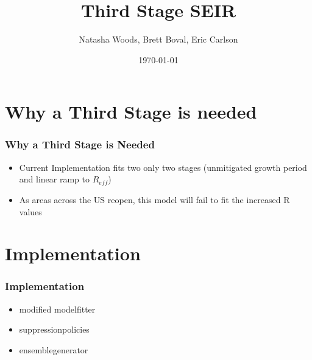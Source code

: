 \documentclass{beamer}
\title[Third Stage SEIR]{Third Stage SEIR} %
\author[Natasha Woods, Brett Boval, Eric Carlson]{Natasha Woods, Brett Boval, Eric Carlson} %
\date{\today} %
\begin{document}
\begin{frame}
\titlepage %
\end{frame}

\begin{frame}
\tableofcontents
\end{frame}



\section{Why a Third Stage is needed} %
\begin{frame}
\frametitle{Why a Third Stage is Needed}
\begin{itemize}[label={-}]
\item Current Implementation fits two only two stages (unmitigated growth period and linear ramp to $R_{eff}$)
\item As areas across the US reopen, this model will fail to fit the increased R values

\end{itemize}
\end{frame}

\section{Implementation} %
\begin{frame}
\frametitle{Implementation}
\begin{itemize}[label={-}]
\item modified modelfitter
\item suppressionpolicies
\item ensemblegenerator
\end{itemize}
\end{frame}
\end{document}
